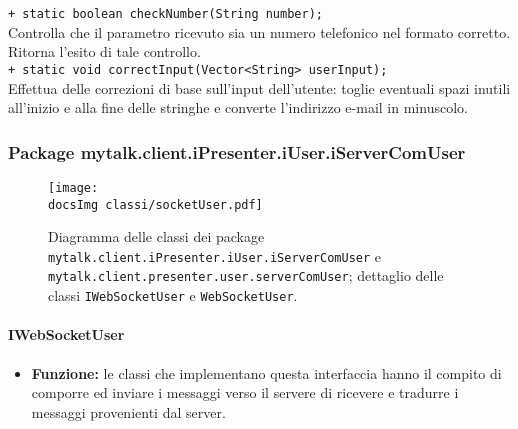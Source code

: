 {{\begin{sloppypar}
{{\begin{itemize}
{					\texttt{+ static boolean checkNumber(String number);}\\
					Controlla che il parametro ricevuto sia un numero telefonico nel formato corretto. Ritorna l'esito di tale controllo.\\
					
					\texttt{+ static void correctInput(Vector<String> userInput);}\\
					Effettua delle correzioni di base sull'input dell'utente: toglie eventuali spazi inutili all'inizio e alla fine delle stringhe e converte l'indirizzo e-mail in minuscolo.
				}
			\end{itemize}
			}

	}
	
	
		\newpage
		\subsubsection{Package mytalk.client.iPresenter.iUser.iServerComUser}{
		
		\begin{figure}[h!tbp]
		\centering
		\label{fig:presenterUserServerComUser}
		\texttt{[image: \\docsImg classi/socketUser.pdf]}
\caption{Diagramma delle classi dei package \nolinkurl{mytalk.client.iPresenter.iUser.iServerComUser} e  \nolinkurl{mytalk.client.presenter.user.serverComUser}; dettaglio delle classi \nolinkurl{IWebSocketUser} e \nolinkurl{WebSocketUser}.}		
	\end{figure}			
		
			
		\paragraph{IWebSocketUser}\label{par:IWebSocketUser}{
			\begin{itemize}
		
				\item[] \textbf{Funzione:}
					le classi che implementano questa interfaccia hanno il compito di comporre ed inviare i messaggi verso il server\g e di ricevere e tradurre i messaggi provenienti dal server\g.\\
			

\end{itemize}}}
\end{sloppypar}}}
